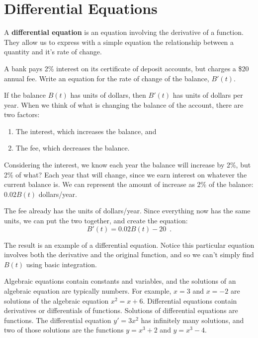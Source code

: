 \section{Differential Equations}
\label{sec:diff-eqs}
A {\bf differential equation} is an equation involving the derivative of a function. They allow us to express with a simple equation the relationship between a quantity and it's rate of change.

\begin{example}
A bank pays 2\% interest on its certificate of deposit accounts, but charges a \$20 annual fee. Write an equation for the rate of change of the balance, $B'(t)$.

\begin{solution}
  If the balance $B(t)$ has units of dollars, then $B'(t)$ has units of dollars per year. When we think of what is changing the balance of the account, there are two factors:
\begin{enumerate}
  \item The interest, which increases the balance, and
  \item The fee, which decreases the balance.
\end{enumerate}
Considering the interest, we know each year the balance will increase by 2\%, but 2\% of what? Each year that will change, since we earn interest on whatever the current balance is. We can represent the amount of increase as 2\% of the balance: $0.02B(t)$ dollars/year.

The fee already has the units of dollars/year. Since everything now has the same units, we can put the two together, and create the equation:
$$B'(t)=0.02B(t)-20 \enspace .$$
\end{solution}\end{example}

The result is an example of a differential equation. Notice this particular equation involves both the derivative and the original function, and so we can't simply find $B(t)$ using basic integration.

Algebraic equations contain constants and variables, and the solutions of an algebraic equation are typically numbers. For example, $x=3$ and $x=-2$ are solutions of the algebraic equation $x^2=x+6$. Differential equations contain derivatives or differentials of functions. Solutions of differential equations are functions. The differential equation $y'=3x^2$ has infinitely many solutions, and two of those solutions are the functions $y=x^3+2$ and $y=x^3-4$.

